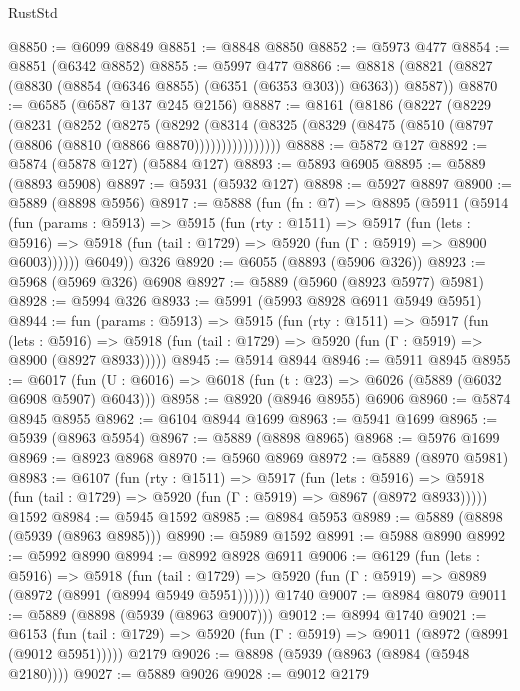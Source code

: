 \begin{lexlean}{RustStd}
\begin{coremodule}
@8850 := @6099 @8849
@8851 := @8848 @8850
@8852 := @5973 @477
@8854 := @8851 (@6342 @8852)
@8855 := @5997 @477
@8866 := @8818 (@8821 (@8827 (@8830 (@8854 (@6346 @8855) (@6351 (@6353 @303)) @6363)) @8587))
@8870 := @6585 (@6587 @137 @245 @2156)
@8887 := @8161
    (@8186
      (@8227
        (@8229
          (@8231
            (@8252
              (@8275
                (@8292
                  (@8314
                    (@8325 (@8329 (@8475 (@8510 (@8797 (@8806 (@8810 (@8866 @8870))))))))))))))))
@8888 := @5872 @127
@8892 := @5874 (@5878 @127) (@5884 @127)
@8893 := @5893 @6905
@8895 := @5889 (@8893 @5908)
@8897 := @5931 (@5932 @127)
@8898 := @5927 @8897
@8900 := @5889 (@8898 @5956)
@8917 := @5888
    (fun (fn : @7) =>
    @8895
      (@5911
        (@5914
          (fun (params : @5913) =>
          @5915
            (fun (rty : @1511) =>
            @5917
              (fun (lets : @5916) =>
              @5918 (fun (tail : @1729) => @5920 (fun (Γ : @5919) => @8900 @6003))))))
        @6049))
    @326
@8920 := @6055 (@8893 (@5906 @326))
@8923 := @5968 (@5969 @326) @6908
@8927 := @5889 (@5960 (@8923 @5977) @5981)
@8928 := @5994 @326
@8933 := @5991 (@5993 @8928 @6911 @5949 @5951)
@8944 := fun (params : @5913) =>
  @5915
    (fun (rty : @1511) =>
    @5917
      (fun (lets : @5916) =>
      @5918 (fun (tail : @1729) => @5920 (fun (Γ : @5919) => @8900 (@8927 @8933)))))
@8945 := @5914 @8944
@8946 := @5911 @8945
@8955 := @6017 (fun (U : @6016) => @6018 (fun (t : @23) => @6026 (@5889 (@6032 @6908 @5907) @6043)))
@8958 := @8920 (@8946 @8955) @6906
@8960 := @5874 @8945 @8955
@8962 := @6104 @8944 @1699
@8963 := @5941 @1699
@8965 := @5939 (@8963 @5954)
@8967 := @5889 (@8898 @8965)
@8968 := @5976 @1699
@8969 := @8923 @8968
@8970 := @5960 @8969
@8972 := @5889 (@8970 @5981)
@8983 := @6107
    (fun (rty : @1511) =>
    @5917
      (fun (lets : @5916) =>
      @5918 (fun (tail : @1729) => @5920 (fun (Γ : @5919) => @8967 (@8972 @8933)))))
    @1592
@8984 := @5945 @1592
@8985 := @8984 @5953
@8989 := @5889 (@8898 (@5939 (@8963 @8985)))
@8990 := @5989 @1592
@8991 := @5988 @8990
@8992 := @5992 @8990
@8994 := @8992 @8928 @6911
@9006 := @6129
    (fun (lets : @5916) =>
    @5918
      (fun (tail : @1729) => @5920 (fun (Γ : @5919) => @8989 (@8972 (@8991 (@8994 @5949 @5951))))))
    @1740
@9007 := @8984 @8079
@9011 := @5889 (@8898 (@5939 (@8963 @9007)))
@9012 := @8994 @1740
@9021 := @6153
    (fun (tail : @1729) => @5920 (fun (Γ : @5919) => @9011 (@8972 (@8991 (@9012 @5951)))))
    @2179
@9026 := @8898 (@5939 (@8963 (@8984 (@5948 @2180))))
@9027 := @5889 @9026
@9028 := @9012 @2179

\end{coremodule}
\end{lexlean}
